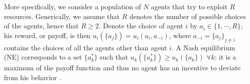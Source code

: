 \documentclass[aps,twocolumn,nofootinbib,sortedaddress,reprint]{revtex4-1}
\begin{document}
%
%
%
%


More specifically, we consider a population of $N$  agents that try to exploit $R$ resources. Generically, we assume that $R$ denotes the number of possible choices of the agents, hence that $R\ge2$. Denote the choice of agent $i$ by $a_i\in\{1,\cdots,R\}$; his reward, or payoff, is then $u_i(\{a_{j}\})=u_i(a_i,a_{-i})$, where $a_{-i}=\{a_j\}_{j\ne i}$ contains the choices of all the agents other than agent $i$. A Nash equilibrium (NE) corresponds to a set $\{a^*_k\}$ such that $u_k(\{a^*_k\})\ge u_k(\{a_{k}\})$ $ \forall k $: it is a maximum of the payoff function and thus no agent has an incentive to deviate from his behavior \cite{FudenbergLevine}.
\end{document}
